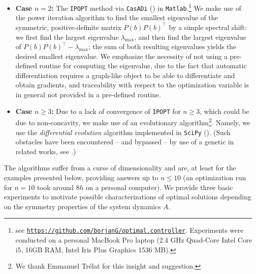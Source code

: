 \documentclass[11pt, a4paper, reqno]{amsart}
\theoremstyle{plain}
\numberwithin{equation}{section}
\begin{document}
	\begin{itemize}
	\item \textbf{Case $n=2$:} The \texttt{IPOPT} method via \texttt{CasADi} (\citep{andersson2019casadi}) in \texttt{Matlab}.\footnote{see \href{https://github.com/borjanG/optimal.controller}{\textcolor{dukeblue}{\texttt{https://github.com/borjanG/optimal.controller}}}. Experiments were conducted on a personal MacBook Pro laptop (2.4 GHz Quad-Core Intel Core i5, 16GB RAM, Intel Iris Plus Graphics 1536 MB).}
	We make use of the power iteration algorithm to find the smallest eigenvalue of the symmetric, positive-definite matrix $P(b)P(b)^\top$ by a simple spectral shift: we first find the largest eigenvalue $\lambda_{\max}$, and then find the largest eigenvalue of $P(b)P(b)^\top-\lambda_{\max}$; the sum of both resulting eigenvalues yields the desired smallest eigenvalue. We emphasize the necessity of not using a pre-defined routine for computing the eigenvalue, due to the fact that automatic differentiation requires a graph-like object to be able to differentiate and obtain gradients, and traceability with respect to the optimization variable is in general not provided in a pre-defined routine. 
	\smallskip 
	
	\item \textbf{Case $n\geqslant3$:} Due to a lack of convergence of \texttt{IPOPT} for $n\geqslant3$, which could be due to non-concavity, we make use of an evolutionary algorithm\footnote{We thank Emmanuel Trélat for this insight and suggestion.}. Namely, we use the \emph{differential evolution} algorithm implemented in \texttt{SciPy} (\citep{storn1997differential}). (Such obstacles have been encountered -- and bypassed -- by use of a genetic in related works, see \citep{hebrard2003optimal, freitas1999optimizing}.)
	\end{itemize} 
	
	\noindent
	The algorithms suffer from a curse of dimensionality and are, at least for the  examples presented below, providing answers up to $n\leqslant10$ (an optimization run for $n=10$ took around $8h$ on a personal computer). We provide three basic experiments to motivate possible characterizations of optimal solutions depending on the symmetry properties of the system dynamics $A$. 
	
\end{document}
